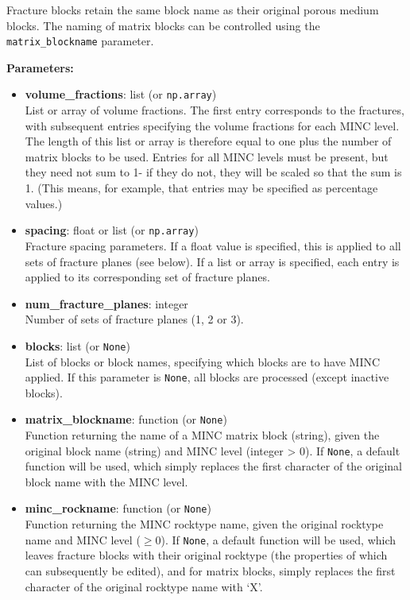 Fracture blocks retain the same block name as their original porous medium blocks. The naming of matrix blocks can be controlled using the \texttt{matrix\_blockname} parameter.

\textbf{Parameters:}
\begin{itemize}
\item \textbf{volume\_fractions}: list (or \texttt{np.array})\\
  List or array of volume fractions. The first entry corresponds to the fractures, with subsequent entries specifying the volume fractions for each MINC level. The length of this list or array is therefore equal to one plus the number of matrix blocks to be used. Entries for all MINC levels must be present, but they need not sum to 1- if they do not, they will be scaled so that the sum is 1. (This means, for example, that entries may be specified as percentage values.)
\item \textbf{spacing}: float or list (or \texttt{np.array})\\
  Fracture spacing parameters. If a float value is specified, this is applied to all sets of fracture planes (see below). If a list or array is specified, each entry is applied to its corresponding set of fracture planes.
\item \textbf{num\_fracture\_planes}: integer\\
  Number of sets of fracture planes (1, 2 or 3).
\item \textbf{blocks}: list (or \texttt{None})\\
  List of blocks or block names, specifying which blocks are to have MINC applied. If this parameter is \texttt{None}, all blocks are processed (except inactive blocks).
\item \textbf{matrix\_blockname}: function (or \texttt{None})\\
  Function returning the name of a MINC matrix block (string), given the original block name (string) and MINC level (integer > 0). If \texttt{None}, a default function will be used, which simply replaces the first character of the original block name with the MINC level.
\item \textbf{minc\_rockname}: function (or \texttt{None})\\
  Function returning the MINC rocktype name, given the original rocktype name and MINC level ($\geq 0$). If \texttt{None}, a default function will be used, which leaves fracture blocks with their original rocktype (the properties of which can subsequently be edited), and for matrix blocks, simply replaces the first character of the original rocktype name with `X'.

\end{itemize}

